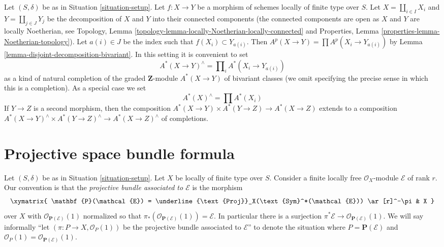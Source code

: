 \begin{remark}
\label{remark-completion-bivariant}
Let $(S, \delta)$ be as in Situation \ref{situation-setup}.
Let $f : X \to Y$ be a morphism of schemes locally of finite type over $S$.
Let $X = \coprod_{i \in I} X_i$ and $Y = \coprod_{j \in J} Y_j$
be the decomposition of $X$ and $Y$ into their connected components
(the connected components are open as $X$ and $Y$ are locally Noetherian, see
Topology, Lemma \ref{topology-lemma-locally-Noetherian-locally-connected} and
Properties, Lemma \ref{properties-lemma-Noetherian-topology}).
Let $a(i) \in J$ be the index such that $f(X_i) \subset Y_{a(i)}$.
Then $A^p(X \to Y) = \prod A^p(X_i \to Y_{a(i)})$ by
Lemma \ref{lemma-disjoint-decomposition-bivariant}.
In this setting it is convenient to set
$$
A^*(X \to Y)^\wedge = \prod\nolimits_i A^*(X_i \to Y_{a(i)})
$$
as a kind of natural completion of the graded $\mathbf{Z}$-module
$A^*(X \to Y)$ of bivariant classes (we omit specifying the precise
sense in which this is a completion). As a special case we set
$$
A^*(X)^\wedge = \prod A^*(X_i)
$$
If $Y \to Z$ is a second morphism, then the
composition $A^*(X \to Y) \times A^*(Y \to Z) \to A^*(X \to Z)$
extends to a composition
$A^*(X \to Y)^\wedge \times A^*(Y \to Z)^\wedge \to A^*(X \to Z)^\wedge$
of completions.
\end{remark}
















\section{Projective space bundle formula}
\label{section-projective-space-bundle-formula}

\noindent
Let $(S, \delta)$ be as in Situation \ref{situation-setup}.
Let $X$ be locally of finite type over $S$.
Consider a finite locally free $\mathcal{O}_X$-module
$\mathcal{E}$ of rank $r$.
Our convention is that the {\it projective bundle associated to
$\mathcal{E}$} is the morphism
$$
\xymatrix{
\mathbf{P}(\mathcal{E}) =
\underline{\text{Proj}}_X(\text{Sym}^*(\mathcal{E}))
\ar[r]^-\pi
& X
}
$$
over $X$ with
$\mathcal{O}_{\mathbf{P}(\mathcal{E})}(1)$ normalized so that
$\pi_*(\mathcal{O}_{\mathbf{P}(\mathcal{E})}(1)) = \mathcal{E}$.
In particular there is a surjection
$\pi^*\mathcal{E} \to \mathcal{O}_{\mathbf{P}(\mathcal{E})}(1)$.
We will say informally ``let $(\pi : P \to X, \mathcal{O}_P(1))$
be the projective bundle associated to $\mathcal{E}$'' to denote
the situation where $P = \mathbf{P}(\mathcal{E})$ and
$\mathcal{O}_P(1) = \mathcal{O}_{\mathbf{P}(\mathcal{E})}(1)$.

